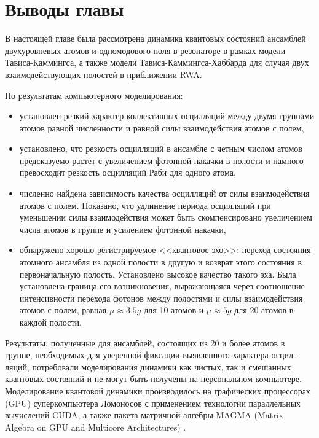 \clearpage
\begin{figure}[h!]
	\noindent{}
\end{figure}

\clearpage
\section{Выводы главы}
В настоящей главе была рассмотрена динамика квантовых состояний ансамблей двухуровневых атомов и одномодового поля в резонаторе в рамках модели Тависа-Каммингса, а также модели Тависа-Каммингса-Хаббарда для случая двух взаимодействующих полостей в приближении RWA.

По результатам компьютерного моделирования:
\begin{itemize}
	\item{установлен резкий характер коллективных осцилляций между двумя группами атомов равной численности и равной силы взаимодействия атомов с полем,}
	\item{установлено, что резкость осцилляций в ансамбле с четным числом атомов предсказуемо растет с увеличением фотонной накачки в полости и намного превосходит резкость осцилляций Раби для одного атома},
	\item{численно найдена зависимость качества осцилляций от силы взаимодействия атомов с полем. Показано, что удлинение периода осцилляций при уменьшении силы взаимодействия может быть скомпенсировано увеличением числа атомов в группе и усилением фотонной накачки,}
	\item{обнаружено хорошо регистрируемое <<квантовое эхо>>: переход состояния атомного ансамбля из одной полости в другую и возврат этого
состояния в первоначальную полость. Установлено высокое качество такого эха. Была установлена граница его возникновения, выражающаяся через соотношение интенсивности перехода фотонов между полостями и силы взаимодействия атомов с полем, равная $\mu \approx 3.5g$ для 10 атомов и $\mu \approx 5g$ для 20 атомов в каждой полости.}
\end{itemize}

\indent Результаты, полученные для ансамблей, состоящих из 20 и более атомов в группе, необходимых для уверенной фиксации выявленного характера осцил­ляций, потребовали моделирования динамики как чистых, так и смешанных квантовых состояний и не могут быть получены на персональном компью­тере. Моделирование квантовой динамики производилось на графических процессорах (GPU) суперкомпьютера Ломоносов с применением технологии па­раллельных вычислений CUDA, а также пакета матричной алгебры MAGMA (Matrix Algebra on GPU and Multicore Architectures) \cite{magma}.
